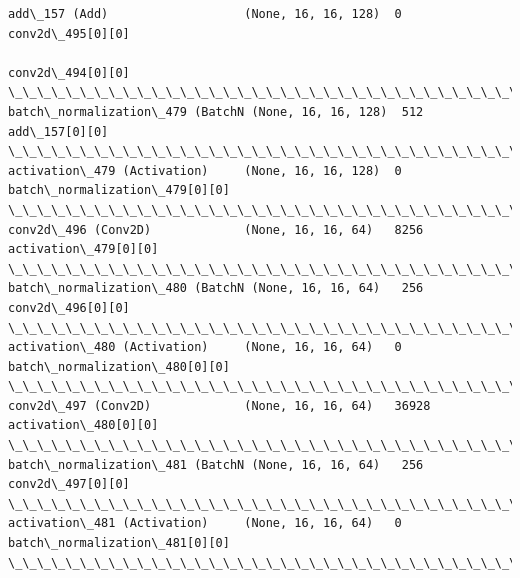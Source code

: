 \documentclass[11pt]{article}
\begin{document}
\begin{Verbatim}[commandchars=\\\{\}]
add\_157 (Add)                   (None, 16, 16, 128)  0           conv2d\_495[0][0]                 
                                                                 conv2d\_494[0][0]                 
\_\_\_\_\_\_\_\_\_\_\_\_\_\_\_\_\_\_\_\_\_\_\_\_\_\_\_\_\_\_\_\_\_\_\_\_\_\_\_\_\_\_\_\_\_\_\_\_\_\_\_\_\_\_\_\_\_\_\_\_\_\_\_\_\_\_\_\_\_\_\_\_\_\_\_\_\_\_\_\_\_\_\_\_\_\_\_\_\_\_\_\_\_\_\_\_\_\_
batch\_normalization\_479 (BatchN (None, 16, 16, 128)  512         add\_157[0][0]                    
\_\_\_\_\_\_\_\_\_\_\_\_\_\_\_\_\_\_\_\_\_\_\_\_\_\_\_\_\_\_\_\_\_\_\_\_\_\_\_\_\_\_\_\_\_\_\_\_\_\_\_\_\_\_\_\_\_\_\_\_\_\_\_\_\_\_\_\_\_\_\_\_\_\_\_\_\_\_\_\_\_\_\_\_\_\_\_\_\_\_\_\_\_\_\_\_\_\_
activation\_479 (Activation)     (None, 16, 16, 128)  0           batch\_normalization\_479[0][0]    
\_\_\_\_\_\_\_\_\_\_\_\_\_\_\_\_\_\_\_\_\_\_\_\_\_\_\_\_\_\_\_\_\_\_\_\_\_\_\_\_\_\_\_\_\_\_\_\_\_\_\_\_\_\_\_\_\_\_\_\_\_\_\_\_\_\_\_\_\_\_\_\_\_\_\_\_\_\_\_\_\_\_\_\_\_\_\_\_\_\_\_\_\_\_\_\_\_\_
conv2d\_496 (Conv2D)             (None, 16, 16, 64)   8256        activation\_479[0][0]             
\_\_\_\_\_\_\_\_\_\_\_\_\_\_\_\_\_\_\_\_\_\_\_\_\_\_\_\_\_\_\_\_\_\_\_\_\_\_\_\_\_\_\_\_\_\_\_\_\_\_\_\_\_\_\_\_\_\_\_\_\_\_\_\_\_\_\_\_\_\_\_\_\_\_\_\_\_\_\_\_\_\_\_\_\_\_\_\_\_\_\_\_\_\_\_\_\_\_
batch\_normalization\_480 (BatchN (None, 16, 16, 64)   256         conv2d\_496[0][0]                 
\_\_\_\_\_\_\_\_\_\_\_\_\_\_\_\_\_\_\_\_\_\_\_\_\_\_\_\_\_\_\_\_\_\_\_\_\_\_\_\_\_\_\_\_\_\_\_\_\_\_\_\_\_\_\_\_\_\_\_\_\_\_\_\_\_\_\_\_\_\_\_\_\_\_\_\_\_\_\_\_\_\_\_\_\_\_\_\_\_\_\_\_\_\_\_\_\_\_
activation\_480 (Activation)     (None, 16, 16, 64)   0           batch\_normalization\_480[0][0]    
\_\_\_\_\_\_\_\_\_\_\_\_\_\_\_\_\_\_\_\_\_\_\_\_\_\_\_\_\_\_\_\_\_\_\_\_\_\_\_\_\_\_\_\_\_\_\_\_\_\_\_\_\_\_\_\_\_\_\_\_\_\_\_\_\_\_\_\_\_\_\_\_\_\_\_\_\_\_\_\_\_\_\_\_\_\_\_\_\_\_\_\_\_\_\_\_\_\_
conv2d\_497 (Conv2D)             (None, 16, 16, 64)   36928       activation\_480[0][0]             
\_\_\_\_\_\_\_\_\_\_\_\_\_\_\_\_\_\_\_\_\_\_\_\_\_\_\_\_\_\_\_\_\_\_\_\_\_\_\_\_\_\_\_\_\_\_\_\_\_\_\_\_\_\_\_\_\_\_\_\_\_\_\_\_\_\_\_\_\_\_\_\_\_\_\_\_\_\_\_\_\_\_\_\_\_\_\_\_\_\_\_\_\_\_\_\_\_\_
batch\_normalization\_481 (BatchN (None, 16, 16, 64)   256         conv2d\_497[0][0]                 
\_\_\_\_\_\_\_\_\_\_\_\_\_\_\_\_\_\_\_\_\_\_\_\_\_\_\_\_\_\_\_\_\_\_\_\_\_\_\_\_\_\_\_\_\_\_\_\_\_\_\_\_\_\_\_\_\_\_\_\_\_\_\_\_\_\_\_\_\_\_\_\_\_\_\_\_\_\_\_\_\_\_\_\_\_\_\_\_\_\_\_\_\_\_\_\_\_\_
activation\_481 (Activation)     (None, 16, 16, 64)   0           batch\_normalization\_481[0][0]    
\_\_\_\_\_\_\_\_\_\_\_\_\_\_\_\_\_\_\_\_\_\_\_\_\_\_\_\_\_\_\_\_\_\_\_\_\_\_\_\_\_\_\_\_\_\_\_\_\_\_\_\_\_\_\_\_\_\_\_\_\_\_\_\_\_\_\_\_\_\_\_\_\_\_\_\_\_\_\_\_\_\_\_\_\_\_\_\_\_\_\_\_\_\_\_\_\_\_

\end{Verbatim}
\end{document}
